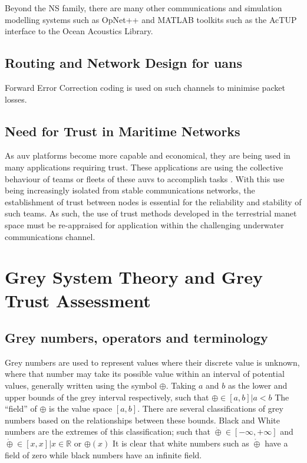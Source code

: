 Beyond the NS family, there are many other communications and simulation modelling systems such as OpNet++\cite{Chang1999} and MATLAB toolkits such as the AcTUP interface to the Ocean Acoustics Library.




\subsection{Routing and Network Design for \glspl{uan}}

Forward Error Correction coding is used on such channels to minimise packet losses.


\subsection{Need for Trust in Maritime Networks}

As \acrfull{auv} platforms become more capable and economical, they are being used in many applications requiring trust.
These applications are using the collective behaviour of teams or fleets of these \glspl{auv} to accomplish tasks \cite{Caiti2011}.
With this use being increasingly isolated from stable communications networks, the establishment of trust between nodes is essential for the reliability and stability of such teams.
As such, the use of trust methods developed in the terrestrial \gls{manet} space must be re-appraised for application within the challenging underwater communications channel.



\section{Grey System Theory and Grey Trust Assessment}
\subsection{Grey numbers, operators and terminology}
Grey numbers are used to represent values where their discrete value is unknown, where that number may take its possible value within an interval of potential values, generally written using the symbol $\oplus$.
Taking $a$ and $b$ as the lower and upper bounds of the grey interval respectively, such that $\oplus \in [a,b] | a < b$ 
The ``field'' of $\oplus$ is the value space $[a,b]$.
There are several classifications of grey numbers based on the relationships between these bounds.
Black and White numbers are the extremes of this classification; such that $\dot\oplus \in [-\infty, +\infty]$ and $\mathring\oplus \in [x, x] | x \in \mathbb{R}$ or $\oplus(x)$
It is clear that white numbers such as $\mathring\oplus$ have a field of zero while black numbers have an infinite field.

